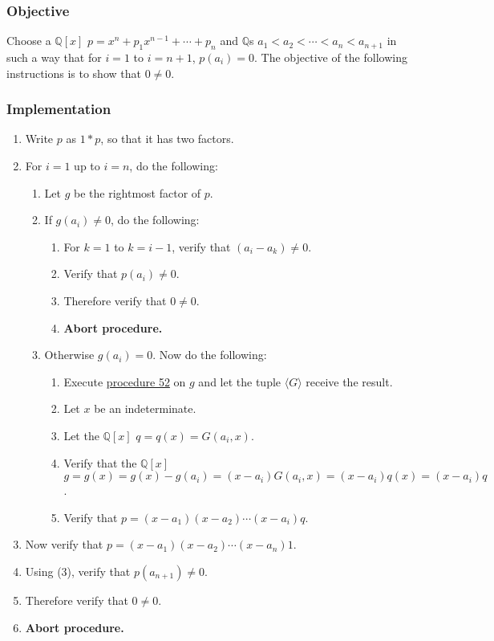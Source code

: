 \documentclass[twocolumn]{article}
\begin{document}
			\subsubsection{Objective}
				Choose a $\mathbb{Q}[x]$ $p=x^n+p_1x^{n-1}+\cdots+p_n$ and $\mathbb{Q}$s $a_1<a_2<\cdots<a_n<a_{n+1}$ in such a way that for $i=1$ to $i=n+1$, $p(a_i)=0$. The objective of the following instructions is to show that $0\ne 0$.
			\subsubsection{Implementation}
				\begin{enumerate}
					\item Write $p$ as $1*p$, so that it has two factors.
					\item For $i=1$ up to $i=n$, do the following:
					\begin{enumerate}
						\item Let $g$ be the rightmost factor of $p$.
						\item If $g(a_i)\ne 0$, do the following:
						\begin{enumerate}
							\item For $k=1$ to $k=i-1$, verify that $(a_i-a_k)\ne 0$.
							\item Verify that $p(a_i)\ne 0$.
							\item Therefore verify that $0\ne 0$.
							\item \textbf{Abort procedure.}
						\end{enumerate}
						\item Otherwise $g(a_i)=0$. Now do the following:
						\begin{enumerate}
							\item Execute \hyperref[sec:procedure 52]{procedure 52} on $g$ and let the tuple $\langle G\rangle$ receive the result.
							\item Let $x$ be an indeterminate.
							\item Let the $\mathbb{Q}[x]$ $q=q(x)=G(a_i,x)$.
							\item Verify that the $\mathbb{Q}[x]$ $g=g(x)=g(x)-g(a_i)=(x-a_i)G(a_i,x)=(x-a_i)q(x)=(x-a_i)q$.
							\item Verify that $p=(x-a_1)(x-a_2)\cdots(x-a_i)q$.
						\end{enumerate}
					\end{enumerate}
					\item Now verify that $p=(x-a_1)(x-a_2)\cdots(x-a_n)1$.
					\item Using (3), verify that $p(a_{n+1})\ne 0$.
					\item Therefore verify that $0\ne 0$.
					\item \textbf{Abort procedure.}
				\end{enumerate}
\end{document}

